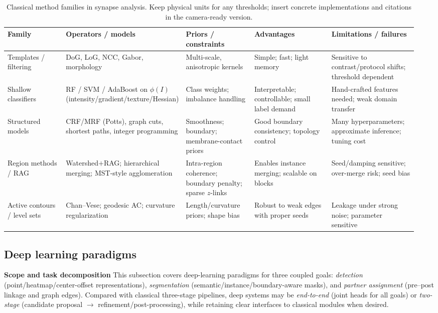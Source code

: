 \medskip
\begin{table}[t]
  \centering
  \scriptsize
  \setlength{\tabcolsep}{2pt}%
  \renewcommand{\arraystretch}{1.05}%
  \begin{tabular}{@{} p{0.15\linewidth} p{0.21\linewidth} p{0.17\linewidth} p{0.20\linewidth} p{0.22\linewidth} @{}}
    \hline
    \textbf{Family} & \textbf{Operators / models} & \textbf{Priors / constraints} & \textbf{Advantages} & \textbf{Limitations / failures} \\
    \hline
    Templates / filtering &
    DoG, LoG, NCC, Gabor, morphology &
    Multi-scale, anisotropic kernels &
    Simple; fast; light memory &
    Sensitive to contrast/protocol shifts; threshold dependent \\
    Shallow classifiers &
    RF / SVM / AdaBoost on \(\phi(I)\) (intensity/gradient/texture/Hessian) &
    Class weights; imbalance handling &
    Interpretable; controllable; small label demand &
    Hand-crafted features needed; weak domain transfer \\
    Structured models &
    CRF/MRF (Potts), graph cuts, shortest paths, integer programming &
    Smoothness; boundary; membrane-contact priors &
    Good boundary consistency; topology control &
    Many hyperparameters; approximate inference; tuning cost \\
    Region methods / RAG &
    Watershed\(+\)RAG; hierarchical merging; MST-style agglomeration &
    Intra-region coherence; boundary penalty; sparse \(z\)-links &
    Enables instance merging; scalable on blocks &
    Seed/damping sensitive; over-merge risk; seed bias \\
    Active contours / level sets &
    Chan--Vese; geodesic AC; curvature regularization &
    Length/curvature priors; shape bias &
    Robust to weak edges with proper seeds &
    Leakage under strong noise; parameter sensitive \\
    \hline
  \end{tabular}
  \caption{Classical method families in synapse analysis. Keep physical units for any thresholds; insert concrete implementations and citations in the camera-ready version.}
  \label{tab:classical-compare}
\end{table}

\subsection{Deep learning paradigms}

\noindent\textbf{Scope and task decomposition}\;
This subsection covers deep-learning paradigms for three coupled goals:
\emph{detection} (point/heatmap/center-offset representations),
\emph{segmentation} (semantic/instance/boundary-aware masks),
and \emph{partner assignment} (pre--post linkage and graph edges).
Compared with classical three-stage pipelines, deep systems may be \emph{end-to-end} (joint heads for all goals) or \emph{two-stage} (candidate proposal \(\rightarrow\) refinement/post-processing), while retaining clear interfaces to classical modules when desired.\par


